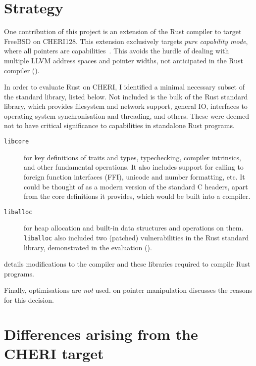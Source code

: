 \documentclass[dissertation.tex]{subfiles}
\begin{document}
\section{Strategy}
\label{sec:impl-what}

One contribution of this project is an extension of the Rust compiler to
target FreeBSD on CHERI128.
This extension exclusively targets \emph{pure capability mode}, where
all pointers are capabilities~\cite{cheri-prog-guide}.
This avoids the hurdle of dealing with multiple LLVM address spaces and
pointer widths, not anticipated in the Rust compiler
().

In order to evaluate  Rust on CHERI, I identified
a minimal necessary subset of the standard library, listed below.
Not included is the bulk of the Rust standard library, which provides
filesystem and network support, general IO, interfaces to operating
system synchronisation and threading, and others.
These were deemed not to have critical significance to capabilities in
standalone Rust programs.

\begin{description}
    \item[\texttt{libcore}] for key definitions of traits and types,
    typechecking, compiler intrinsics, and other fundamental operations.
    It also includes support for calling to foreign function interfaces
    (FFI), unicode and number formatting, etc.
    It could be thought of as a modern version of the standard C
    headers, apart from the core definitions it provides, which would be
    built into a compiler.
    \item[\texttt{liballoc}] for heap allocation and built-in data
    structures and operations on them.
    \texttt{liballoc} also included two (patched) vulnerabilities in the
    Rust standard library, demonstrated in the evaluation
    ().
\end{description}

 details modifications to the compiler and
these libraries required to compile Rust programs.

Finally, optimisations are \emph{not} used.
 on pointer manipulation discusses the
reasons for this decision.


\section{Differences arising from the CHERI target}
\label{sec:impl-divergences}
\end{document}
